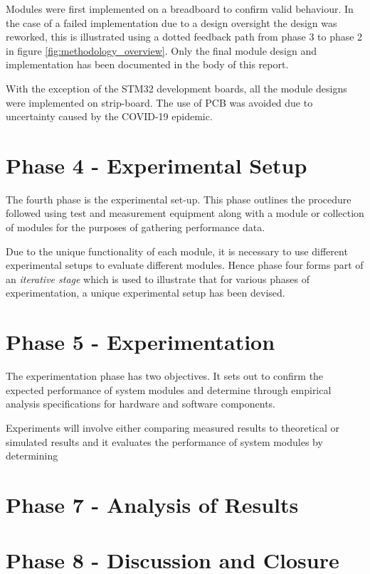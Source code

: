 Modules were first implemented on a breadboard to confirm valid behaviour. In the case of a failed implementation due to a design oversight the design was reworked, this is illustrated using a dotted feedback path from phase 3 to phase 2 in figure \ref{fig:methodology_overview}. Only the final module design and implementation has been documented in the body of this report.

With the exception of the STM32 development boards, all the module designs were implemented on strip-board. The use of PCB was avoided due to uncertainty caused by the COVID-19 epidemic.



\section{Phase 4 - Experimental Setup}

The fourth phase is the experimental set-up. This phase outlines the procedure followed using test and measurement equipment along with a module or collection of modules for the purposes of gathering performance data.

Due to the unique functionality of each module, it is necessary to use different experimental setups to evaluate different modules. Hence phase four forms part of an \textit{iterative stage} which is used to illustrate that for various phases of experimentation, a unique experimental setup has been devised.





\section{Phase 5 - Experimentation}

The experimentation phase has two objectives. It sets out to confirm the expected performance of system modules and determine through empirical analysis specifications for hardware and software components.

Experiments will involve either comparing measured results to theoretical or simulated results and it evaluates the performance of system modules by determining 



\section{Phase 7 - Analysis of Results}



\section{Phase 8 - Discussion and Closure}








